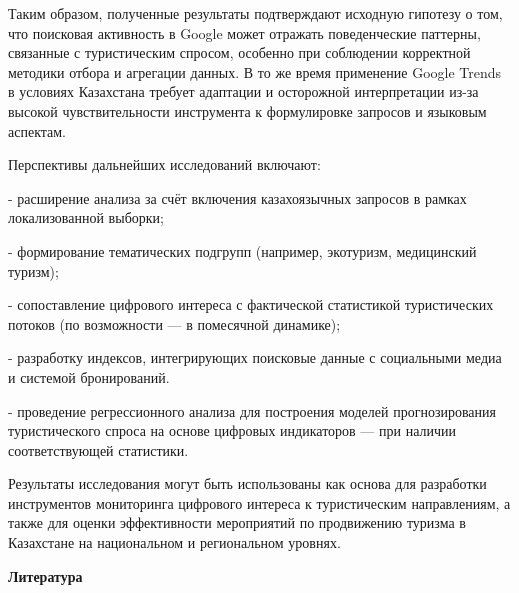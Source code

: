\begin{multicols}{2}
Таким образом, полученные результаты подтверждают исходную гипотезу о
том, что поисковая активность в Google может отражать поведенческие
паттерны, связанные с туристическим спросом, особенно при соблюдении
корректной методики отбора и агрегации данных. В то же время применение
Google Trends в условиях Казахстана требует адаптации и осторожной
интерпретации из-за высокой чувствительности инструмента к формулировке
запросов и языковым аспектам.

Перспективы дальнейших исследований включают:

- расширение анализа за счёт включения казахоязычных запросов в рамках
локализованной выборки;

- формирование тематических подгрупп (например, экотуризм, медицинский
туризм);

- сопоставление цифрового интереса с фактической статистикой
туристических потоков (по возможности --- в помесячной динамике);

- разработку индексов, интегрирующих поисковые данные с социальными
медиа и системой бронирований.

- проведение регрессионного анализа для построения моделей
прогнозирования туристического спроса на основе цифровых индикаторов
--- при наличии соответствующей статистики.

Результаты исследования могут быть использованы как основа для
разработки инструментов мониторинга цифрового интереса к туристическим
направлениям, а также для оценки эффективности мероприятий по
продвижению туризма в Казахстане на национальном и региональном уровнях.
\end{multicols}

\begin{center}
{\bfseries Литература}
\end{center}


